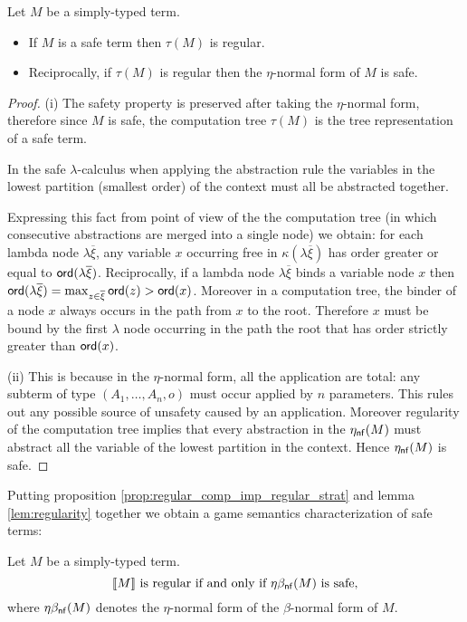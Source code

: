 \begin{lem}
\label{lem:regularity}
Let $M$ be a simply-typed term.
\begin{itemize}
\item[(i)] If $M$ is a safe term then $\tau(M)$ is regular.
\item[(ii)] Reciprocally, if $\tau(M)$ is regular then the $\eta$-normal form of $M$ is safe.
\end{itemize}
\end{lem}
\begin{proof}
(i) The safety property is preserved after taking the $\eta$-normal form, therefore since
$M$ is safe, the computation tree $\tau(M)$ is the tree representation of a safe term.

In the safe $\lambda$-calculus when applying the abstraction rule the variables in the lowest partition (smallest order) of the context
 must all be abstracted together.

Expressing this fact from point of view of the the computation tree
(in which consecutive abstractions are merged into a single node) we obtain:
for each lambda node $\lambda \overline{\xi}$, any variable $x$ occurring free in $\kappa(\lambda \overline{\xi})$
has order greater or equal to ${\sf ord}(\lambda \overline{\xi})$. Reciprocally, if a lambda node $\lambda \overline{\xi}$
binds a variable node $x$ then ${\sf ord}(\lambda \overline{\xi}) = \max_{z\in\overline{\xi}} {\sf ord}(z) > {\sf ord}(x)$.
Moreover in a computation tree, the binder of a node $x$ always occurs in the path from $x$ to the root.
Therefore $x$ must be bound by the first $\lambda$ node occurring in the path the root
that has order strictly greater than ${\sf ord}(x)$.

(ii) This is because in the $\eta$-normal form, all the application are total: any subterm of type $(A_1,\ldots,A_n,o)$
must occur applied by $n$ parameters. This rules out any possible source of unsafety caused by an application.
Moreover regularity of the computation tree implies that every abstraction in the
$\eta_{\sf nf}(M)$ must abstract all the variable of the lowest partition in the context.
Hence $\eta_{\sf nf}(M)$ is safe.
\end{proof}

Putting proposition \ref{prop:regular_comp_imp_regular_strat} and lemma \ref{lem:regularity} together we
obtain a game semantics characterization of safe terms:
\begin{cor}
Let $M$ be a  simply-typed term.
$$ {[\![ M ]\!]} \mbox{ is regular if and only if $\eta\beta_{\sf nf}(M)$ is safe,} $$
where $\eta\beta_{\sf nf}(M)$ denotes the $\eta$-normal form of the $\beta$-normal form of $M$.
\end{cor}



